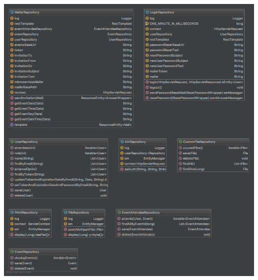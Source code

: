 \documentclass[11pt]{article} %
\begin{document}
\includegraphics[width=1.0\textwidth]{class-diagrams/Eventmanagement-Endpoints}
\\
\\
\end{document}
